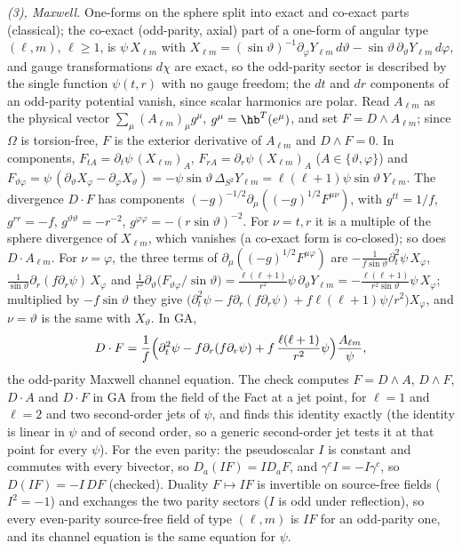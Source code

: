 \emph{(3), Maxwell.} One-forms on the sphere split into exact and co-exact parts (classical); the co-exact (odd-parity, axial) part of a one-form of angular type $(\ell, m)$, $\ell \geq 1$, is $\psi\,X_{\ell m}$ with $X_{\ell m} = (\sin\vartheta)^{-1}\partial_{\varphi}Y_{\ell m}\,d\vartheta - \sin\vartheta\,\partial_{\vartheta}Y_{\ell m}\,d\varphi$, and gauge transformations $d\chi$ are exact, so the odd-parity sector is described by the single function $\psi(t,r)$ with no gauge freedom; the $dt$ and $dr$ components of an odd-parity potential vanish, since scalar harmonics are polar. Read $A_{\ell m}$ as the physical vector $\sum_{\mu}(A_{\ell m})_{\mu}g^{\mu}$, $g^{\mu} = \hb^{T}(e^{\mu})$, and set $F = D \wedge A_{\ell m}$; since $\Omega$ is torsion-free, $F$ is the exterior derivative of $A_{\ell m}$ and $D \wedge F = 0$. In components, $F_{tA} = \partial_{t}\psi\,(X_{\ell m})_{A}$, $F_{rA} = \partial_{r}\psi\,(X_{\ell m})_{A}$ ($A \in \{\vartheta, \varphi\}$) and $F_{\vartheta\varphi} = \psi\,(\partial_{\vartheta}X_{\varphi} - \partial_{\varphi}X_{\vartheta}) = -\psi\sin\vartheta\,\Delta_{S^{2}}Y_{\ell m} = \ell(\ell+1)\psi\sin\vartheta\,Y_{\ell m}$. The divergence $D \cdot F$ has components $(-g)^{-1/2}\partial_{\mu}((-g)^{1/2}F^{\mu\nu})$, with $g^{tt} = 1/f$, $g^{rr} = -f$, $g^{\vartheta\vartheta} = -r^{-2}$, $g^{\varphi\varphi} = -(r\sin\vartheta)^{-2}$. For $\nu = t, r$ it is a multiple of the sphere divergence of $X_{\ell m}$, which vanishes (a co-exact form is co-closed); so does $D \cdot A_{\ell m}$. For $\nu = \varphi$, the three terms of $\partial_{\mu}((-g)^{1/2}F^{\mu\varphi})$ are $-\tfrac{1}{f\sin\vartheta}\partial_{t}^{2}\psi\,X_{\varphi}$, $\tfrac{1}{\sin\vartheta}\partial_{r}(f\partial_{r}\psi)\,X_{\varphi}$ and $\tfrac{1}{r^{2}}\partial_{\vartheta}\bigl(F_{\vartheta\varphi}/\sin\vartheta\bigr) = \tfrac{\ell(\ell+1)}{r^{2}}\psi\,\partial_{\vartheta}Y_{\ell m} = -\tfrac{\ell(\ell+1)}{r^{2}\sin\vartheta}\psi\,X_{\varphi}$; multiplied by $-f\sin\vartheta$ they give $\bigl(\partial_{t}^{2}\psi - f\partial_{r}(f\partial_{r}\psi) + f\ell(\ell+1)\psi/r^{2}\bigr)X_{\varphi}$, and $\nu = \vartheta$ is the same with $X_{\vartheta}$. In GA,
\[
D \cdot F = \frac{1}{f}\Bigl(\partial_{t}^{2}\psi - f\partial_{r}(f\partial_{r}\psi) + f\,\frac{\ell(\ell+1)}{r^{2}}\psi\Bigr)\frac{A_{\ell m}}{\psi},
\]
the odd-parity Maxwell channel equation. The check computes $F = D \wedge A$, $D \wedge F$, $D \cdot A$ and $D \cdot F$ in GA from the field of the Fact at a jet point, for $\ell = 1$ and $\ell = 2$ and two second-order jets of $\psi$, and finds this identity exactly (the identity is linear in $\psi$ and of second order, so a generic second-order jet tests it at that point for every $\psi$). For the even parity: the pseudoscalar $I$ is constant and commutes with every bivector, so $D_{a}(IF) = I D_{a}F$, and $\gamma^{c}I = -I\gamma^{c}$, so $D(IF) = -I\,DF$ (checked). Duality $F \mapsto IF$ is invertible on source-free fields ($I^{2} = -1$) and exchanges the two parity sectors ($I$ is odd under reflection), so every even-parity source-free field of type $(\ell, m)$ is $IF$ for an odd-parity one, and its channel equation is the same equation for $\psi$.

